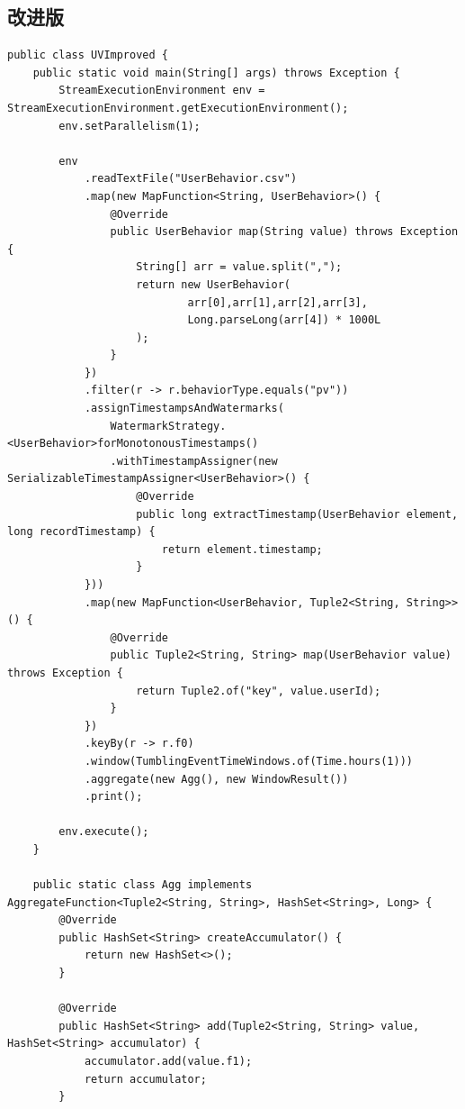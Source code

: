 \documentclass[cn,11pt,chinese]{elegantbook}
\begin{document}
\subsection{改进版}

\begin{verbatim}
public class UVImproved {
    public static void main(String[] args) throws Exception {
        StreamExecutionEnvironment env = StreamExecutionEnvironment.getExecutionEnvironment();
        env.setParallelism(1);

        env
            .readTextFile("UserBehavior.csv")
            .map(new MapFunction<String, UserBehavior>() {
                @Override
                public UserBehavior map(String value) throws Exception {
                    String[] arr = value.split(",");
                    return new UserBehavior(
                            arr[0],arr[1],arr[2],arr[3],
                            Long.parseLong(arr[4]) * 1000L
                    );
                }
            })
            .filter(r -> r.behaviorType.equals("pv"))
            .assignTimestampsAndWatermarks(
                WatermarkStrategy.<UserBehavior>forMonotonousTimestamps()
                .withTimestampAssigner(new SerializableTimestampAssigner<UserBehavior>() {
                    @Override
                    public long extractTimestamp(UserBehavior element, long recordTimestamp) {
                        return element.timestamp;
                    }
            }))
            .map(new MapFunction<UserBehavior, Tuple2<String, String>>() {
                @Override
                public Tuple2<String, String> map(UserBehavior value) throws Exception {
                    return Tuple2.of("key", value.userId);
                }
            })
            .keyBy(r -> r.f0)
            .window(TumblingEventTimeWindows.of(Time.hours(1)))
            .aggregate(new Agg(), new WindowResult())
            .print();

        env.execute();
    }

    public static class Agg implements AggregateFunction<Tuple2<String, String>, HashSet<String>, Long> {
        @Override
        public HashSet<String> createAccumulator() {
            return new HashSet<>();
        }

        @Override
        public HashSet<String> add(Tuple2<String, String> value, HashSet<String> accumulator) {
            accumulator.add(value.f1);
            return accumulator;
        }


\end{verbatim}
\end{document}
